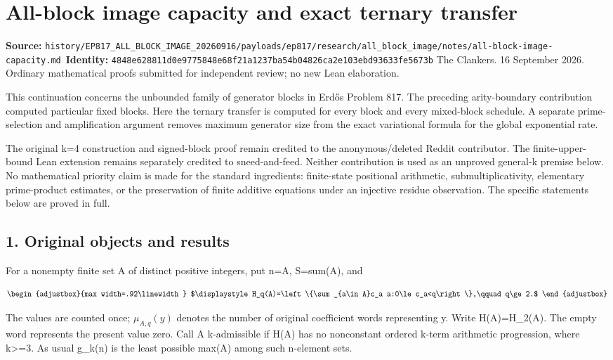 \chapter{All-block image capacity and exact ternary transfer}
\label{chapter:22_all-block-image-capacity}
{\small\noindent\textbf{Source:} \nolinkurl{history/EP817_ALL_BLOCK_IMAGE_20260916/payloads/ep817/research/all_block_image/notes/all-block-image-capacity.md}\
\textbf{Identity:} \nolinkurl{4848e628811d0e9775848e68f21a1237ba54b04826ca2e103ebd93633fe5673b}}
\medskip
The Clankers. 16 September 2026. Ordinary mathematical proofs submitted for independent review; no new Lean elaboration.

This continuation concerns the unbounded family of generator blocks in Erdős Problem 817. The preceding arity-boundary contribution computed particular fixed blocks. Here the ternary transfer is computed for every block and every mixed-block schedule. A separate prime-selection and amplification argument removes maximum generator size from the exact variational formula for the global exponential rate.

The original k=4 construction and signed-block proof remain credited to the anonymous/deleted Reddit contributor. The finite-upper-bound Lean extension remains separately credited to sneed-and-feed. Neither contribution is used as an unproved general-k premise below. No mathematical priority claim is made for the standard ingredients: finite-state positional arithmetic, submultiplicativity, elementary prime-product estimates, or the preservation of finite additive equations under an injective residue observation. The specific statements below are proved in full.

\section{1. Original objects and results}\label{n22-original-objects-and-results}

For a nonempty finite set A of distinct positive integers, put n=\textbar A\textbar, S=sum(A), and

\[
\begin{adjustbox}{max width=.92\linewidth}
$\displaystyle H_q(A)=\left\{\sum_{a\in A}c_a a:0\le c_a<q\right\},\qquad q\ge2.$
\end{adjustbox}
\]

The values are counted once; \(\mu_{A,q}(y)\) denotes the number of original coefficient words representing y. Write H(A)=H\_2(A). The empty word represents the present value zero. Call A k-admissible if H(A) has no nonconstant ordered k-term arithmetic progression, where k\textgreater=3. As usual g\_k(n) is the least possible max(A) among such n-element sets.

